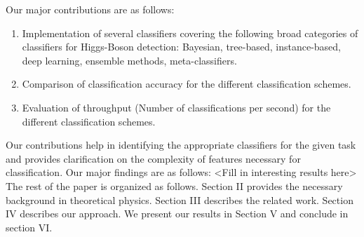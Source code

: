 Our major contributions are as follows:
\begin{enumerate}
\item	Implementation of several classifiers covering the following broad categories of classifiers for Higgs-Boson detection: Bayesian, tree-based, instance-based, deep learning, ensemble methods, meta-classifiers.
\item	Comparison of classification accuracy for the different classification schemes.
\item	Evaluation of throughput (Number of classifications per second) for the different classification schemes.
\end{enumerate}
Our contributions help in identifying the appropriate classifiers for the given task and provides clarification on the complexity of features necessary for classification.
Our major findings are as follows: <Fill in interesting results here>
The rest of the paper is organized as follows. Section II provides the necessary background in theoretical physics. Section III describes the related work. Section IV describes our approach. We present our results in Section V and conclude in section VI.


